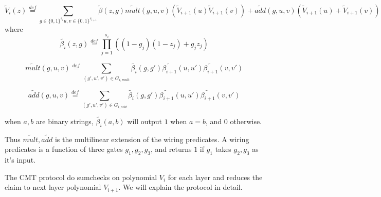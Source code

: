 \begin{definition}
$$\tilde{V}_{i}(z)\overset{def}{=}\sum_{g\in\{0,1\}^{s_i} u, v\in \{0,1\}^{s_{i+1}}}\tilde{\beta}(z, g)\tilde{mult}(g, u, v)(\tilde{V}_{i+1}(u)\tilde{V}_{i+1}(v))+\tilde{add}(g,u,v)(\tilde{V}_{i+1}(u)+\tilde{V}_{i+1}(v))$$
where $$\tilde{\beta_{i}}(z,g)\overset{def}{=}\prod_{j=1}^{s_{i}}((1-g_{j})(1-z_{j})+g_{j}z_{j})$$

$$\tilde{mult}(g,u,v)\overset{def}{=}\sum_{(g', u', v')\in G_{i,mult}}\tilde{\beta_{i}}(g,g')\tilde{\beta_{i+1}}(u,u')\tilde{\beta_{i+1}}(v,v')$$

$$\tilde{add}(g,u,v)\overset{def}{=}\sum_{(g', u', v')\in G_{i,add}}\tilde{\beta_{i}}(g,g')\tilde{\beta_{i+1}}(u,u')\tilde{\beta_{i+1}}(v,v')$$

when $a, b$ are binary strings, $\tilde{\beta_{i}}(a, b)$ will output $1$ when $a=b$, and $0$ otherwise.

Thus $\tilde{mult},\tilde{add}$ is the multilinear extension of the wiring predicates. A wiring predicates is a function of three gates $g_1, g_2, g_3$, and returns $1$ if $g_1$ takes $g_2, g_3$ as it's input.

\end{definition}

The CMT protocol do sumchecks on polynomial $V_{i}$ for each layer and reduces the claim to next layer polynomial $V_{i+1}$. We will explain the protocol in detail.

